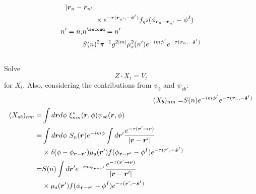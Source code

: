 \documentclass [10pt,letterpaper]{article}
\newcommand{\unitvectorsym}[1]{\hat{\vectorsym{#1}}}
\begin{document}
\begin{subequations}
\begin{align}
\begin{split}
			{\lvert \vectorsym{r}_n - \vectorsym{r}_{n^\prime} \rvert}
			\\
			&
			\times
			e^{-\tau(\vectorsym{r}_{n^\prime},-\unitvectorsym{s}^I)}
			f_{g^2}(
			\phi_{\vectorsym{r}_n-\vectorsym{r}_{n^\prime}}
			-
			\phi^I
			)
		\end{split}
		\\
		\begin{split} \label{eq:result-Vtnm-1pt-npn-nppnp}
			n^\prime = n
			,&
			n^\second = n^\prime
			\\
			&
			S(n)^2
			\pi^{-1}
			g^{2 \lvert m \rvert}
			\mu_s^2(n^\prime)
			e^{-i m \phi^I}
			e^{-\tau(\vectorsym{r}_n,-\unitvectorsym{s}^I)}
		\end{split}
	\end{align}
\end{subequations}
\\
Solve
\begin{equation} \label{eq:Z-Xt-Vt}
	Z\cdot X_t = V_t
\end{equation}
for $X_t$.
Also, considering the contributions from $\psi_b$ and $\psi_{sb}$:
\begin{subequations} \label{eq:result-Xbnm-1pt-2ndtime-der-Xsbnm-1pt}
	\begin{align} 
		(X_b)_{n m}
		=&
		S(n)
		e^{-i m \phi^I}
		e^{-\tau(\vectorsym{r}_n,-\unitvectorsym{s}^I)}
		\label{eq:result-Xbnm-1pt-2ndtime}
		\\
		\begin{split}
			(X_{sb})_{n m}
			=&
			\int d\vectorsym{r} d\phi
			\ \xi^*_{n m}(\vectorsym{r},\phi)
			\psi_{sb}(\vectorsym{r},\phi)
			\\
			=& 
			\int d\vectorsym{r} d\phi
			\ S_n(\vectorsym{r})
			e^{-i m \phi}
			\int d\vectorsym{r}^\prime
			\frac
			{e^{-\tau(\vectorsym{r}^\prime\to\vectorsym{r})}}
			{\lvert \vectorsym{r}-\vectorsym{r}^\prime \rvert}
			\\
			&
			\times
			\delta(\phi-\phi_{\vectorsym{r}-\vectorsym{r}^\prime})
			\mu_s(\vectorsym{r}^\prime)
			f(\phi_{\vectorsym{r}-\vectorsym{r}^\prime}-\phi^I)
			e^{-\tau(\vectorsym{r}^\prime,-\unitvectorsym{s}^I)} 
			\\
			=& 
			S(n)
			\int
			d\vectorsym{r}^\prime
			e^{-i m \phi_{\vectorsym{r}-\vectorsym{r}^\prime}}
			\frac
			{e^{-\tau(\vectorsym{r}^\prime\to\vectorsym{r})}}
			{\lvert \vectorsym{r}-\vectorsym{r}^\prime \rvert}
			\\
			&
			\times
			\mu_s(\vectorsym{r}^\prime)
			f(\phi_{\vectorsym{r}-\vectorsym{r}^\prime}-\phi^I)
			e^{-\tau(\vectorsym{r}^\prime,-\unitvectorsym{s}^I)} 
		\end{split}
		\label{eq:der-Xsbnm-1pt}
	\end{align}
\end{subequations}
\end{document}

